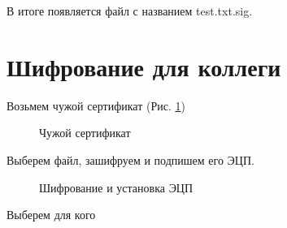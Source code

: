 \documentclass[10pt,a4paper]{report}
\begin{document}
В итоге появляется файл с названием test.txt.sig.



\section{Шифрование для коллеги}
Возьмем чужой сертификат (Рис. \ref{pic:pic6})

\begin{figure}[h]
	\caption{Чужой сертификат}
	\label{pic:pic6}
\end{figure}

Выберем файл, зашифруем и подпишем его ЭЦП.\\

\begin{figure}[h]
	\caption{Шифрование и установка ЭЦП}
	\label{pic:pic7}
\end{figure}	
Выберем для кого
\end{document}
